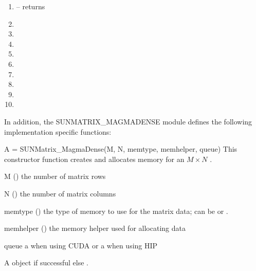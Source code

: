 \begin{enumerate}
  \item {} -- returns 
  \item {}
  \item {}
  \item {}
  \item {}
  \item {}
  \item {}
  \item {}
  \item {}
  \item {}
\end{enumerate}


In addition, the SUNMATRIX\_MAGMADENSE module defines the following implementation specific
functions:

{
  A = SUNMatrix\_MagmaDense(M, N, memtype, memhelper, queue)
}
{
  This constructor function creates and allocates memory for an $M \times N$
   .
}
{
  \begin{args}[memhelper]
  \item[M] () the number of matrix rows
  \item[N] () the number of matrix columns
  \item[memtype] () the type of memory to use for the matrix data; can be  or .
  \item[memhelper] () the memory helper used for allocating data
  \item[queue] a  when using CUDA or a  when using HIP
  \end{args}
}
{
  A  object if successful else .
}
{}

